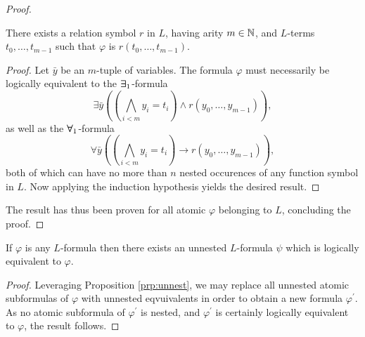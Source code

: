 \begin{proof}
	\begin{case}
		There exists a relation symbol $r$ in $L$, having arity $m\in\mathbb{N}$, and $L$-terms $t_0,\dotsc,t_{m-1}$ such that $\varphi$ is $r(t_0,\dotsc,t_{m-1})$.
	\end{case}
	\begin{proof}
		Let $\bar{y}$ be an $m$-tuple of variables.  The formula $\varphi$ must necessarily be logically equivalent to the $\bm{\exists}_{1}$-formula
		\begin{equation}
			\exists\bar{y}\left(\left(\bigwedge_{i<m}y_i=t_i\right)\wedge r(y_0,\dotsc,y_{m-1})\right),
		\end{equation}
		as well as the $\bm{\forall}_{1}$-formula
		\begin{equation}
			\forall\bar{y}\left(\left(\bigwedge_{i<m}y_i=t_i\right)\rightarrow r(y_0,\dotsc,y_{m-1})\right),
		\end{equation}
		both of which can have no more than $n$ nested occurences of any function symbol in $L$.  Now applying the induction hypothesis yields the desired result.
	\end{proof}
	The result has thus been proven for all atomic $\varphi$ belonging to $L$, concluding the proof.
\end{proof}

\begin{cor}\label{cor:unnest}
	If $\varphi$ is any $L$-formula then there exists an unnested $L$-formula $\psi$ which is logically equivalent to $\varphi$.
\end{cor}
\begin{proof}
	Leveraging Proposition \ref{prp:unnest}, we may replace all unnested atomic subformulas of $\varphi$ with unnested eqvuivalents in order to obtain a new formula $\varphi^\prime$.  As no atomic subformula of $\varphi^\prime$ is nested, and $\varphi^\prime$ is certainly logically equivalent to $\varphi$, the result follows.
\end{proof}

